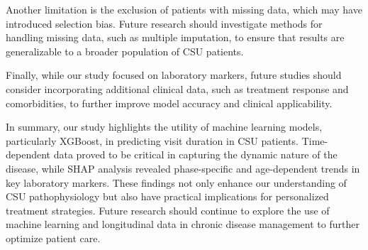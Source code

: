 \documentclass[final,3p,times,authoryear]{elsarticle}
\begin{document}
Another limitation is the exclusion of patients with missing data, which may have introduced selection bias. Future research should investigate methods for handling missing data, such as multiple imputation, to ensure that results are generalizable to a broader population of CSU patients.

Finally, while our study focused on laboratory markers, future studies should consider incorporating additional clinical data, such as treatment response and comorbidities, to further improve model accuracy and clinical applicability.

In summary, our study highlights the utility of machine learning models, particularly XGBoost, in predicting visit duration in CSU patients. Time-dependent data proved to be critical in capturing the dynamic nature of the disease, while SHAP analysis revealed phase-specific and age-dependent trends in key laboratory markers. These findings not only enhance our understanding of CSU pathophysiology but also have practical implications for personalized treatment strategies. Future research should continue to explore the use of machine learning and longitudinal data in chronic disease management to further optimize patient care.




\end{document}
